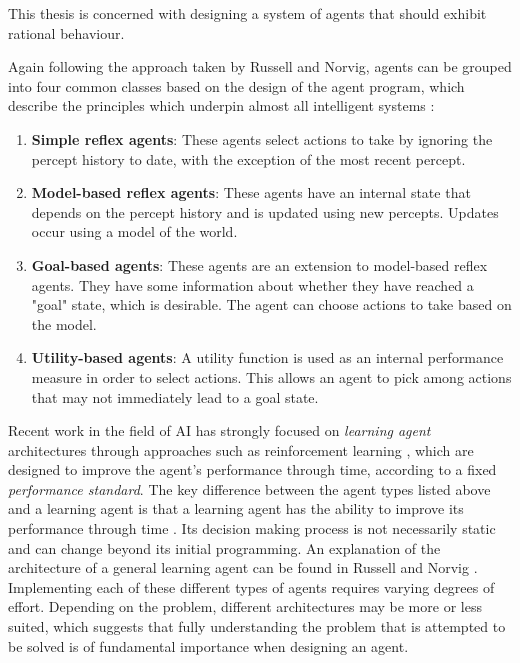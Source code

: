This thesis is concerned with designing a system of agents that should exhibit rational behaviour.\newline
 
 

Again following the approach taken by Russell and Norvig, agents can be grouped into four common classes based on the design of the agent program, which describe the principles which underpin almost all intelligent systems \cite[p.~47]{AIAMA}: 
\begin{enumerate}
    \item \textbf{Simple reflex agents}: These agents select actions to take by ignoring the percept history to date, with the exception of the most recent percept.
    \item \textbf{Model-based reflex agents}: These agents have an internal state that depends on the percept history and is updated using new percepts. Updates occur using a model of the world.
    \item \textbf{Goal-based agents}: These agents are an extension to model-based reflex agents. They have some information about whether they have reached a "goal" state, which is desirable. The agent can choose actions to take based on the model. 
    \item \textbf{Utility-based agents}: A utility function is used as an internal performance measure in order to select actions. This allows an agent to pick among actions that may not immediately lead to a goal state.
\end{enumerate}
\par Recent work in the field of AI has strongly focused on \textit{learning agent} architectures through approaches such as reinforcement learning \cite{Sutton1998}, which are designed to improve the agent's performance through time, according to a fixed \textit{performance standard}. The key difference between the agent types listed above and a learning agent is that a learning agent has the ability to improve its performance through time \cite{AIAMA}. Its decision making process is not necessarily static and can change beyond its initial programming. An explanation of the architecture of a general learning agent can be found in Russell and Norvig \cite[p.~55]{AIAMA}. Implementing each of these different types of agents requires varying degrees of effort. Depending on the problem, different architectures may be more or less suited, which suggests that fully understanding the problem that is attempted to be solved is of fundamental importance when designing an agent.

